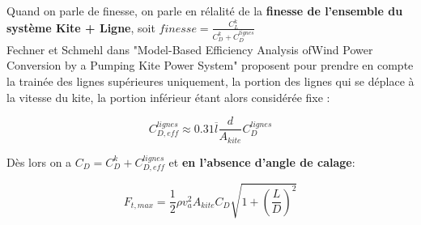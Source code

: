 Quand on parle de finesse, on parle en rélalité de la \textbf{finesse de l'ensemble du système Kite + Ligne}, soit $finesse = \frac{C_L^k}{C_D^k + C_D^{lignes}}$\\

Fechner et Schmehl dans "Model-Based Efficiency Analysis ofWind Power Conversion by a Pumping Kite Power System" proposent pour prendre en compte la trainée des lignes supérieures uniquement, la portion des lignes qui se déplace à la vitesse du kite, la portion inférieur étant alors considérée fixe :

\begin{equation}
    C_{D, eff}^{lignes} \approx  0.31 \overline{l} \frac{d}{A_{kite}} C_D^{lignes}
\end{equation}

Dès lors on a $C_D = C_D^k + C_{D, eff}^{lignes} $ et \textbf{en l'absence d'angle de calage}:

\begin{equation}
    F_{t, max} = \frac{1}{2} \rho v_a^2 A_{kite} C_D \sqrt{1 + (\frac{L}{D})^2}
\end{equation}